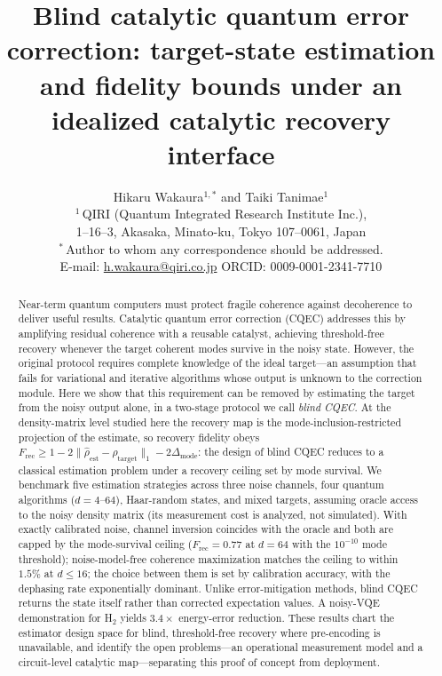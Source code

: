 \documentclass[12pt,a4paper]{article}
\newcommand{\Frec}{F_\mathrm{rec}}
\newcommand{\rhot}{\rho_\mathrm{target}}
\newcommand{\rhoe}{\hat{\rho}_\mathrm{est}}
\begin{document}
\title{Blind catalytic quantum error correction: target-state estimation and fidelity bounds under an idealized catalytic recovery interface}

\author{Hikaru Wakaura$^{1,*}$ and Taiki Tanimae$^{1}$\\[0.6em]
\small $^{1}$\,QIRI (Quantum Integrated Research Institute Inc.),\\
\small 1--16--3, Akasaka, Minato-ku, Tokyo 107--0061, Japan\\[0.3em]
\small $^{*}$\,Author to whom any correspondence should be addressed.\\
\small E-mail: \href{mailto:h.wakaura@qiri.co.jp}{h.wakaura@qiri.co.jp} \quad ORCID: 0009-0001-2341-7710}
\date{}
\maketitle

\begin{abstract}
Near-term quantum computers must protect fragile coherence against decoherence to deliver useful results.
Catalytic quantum error correction (CQEC) addresses this by amplifying residual coherence with a reusable catalyst, achieving threshold-free recovery whenever the target coherent modes survive in the noisy state.
However, the original protocol requires complete knowledge of the ideal target---an assumption that fails for variational and iterative algorithms whose output is unknown to the correction module.
Here we show that this requirement can be removed by estimating the target from the noisy output alone, in a two-stage protocol we call \emph{blind CQEC}.
At the density-matrix level studied here the recovery map is the mode-inclusion-restricted projection of the estimate, so recovery fidelity obeys $\Frec \geq 1 - 2\|\rhoe - \rhot\|_1 - 2\Delta_\mathrm{mode}$: the design of blind CQEC reduces to a classical estimation problem under a recovery ceiling set by mode survival.
We benchmark five estimation strategies across three noise channels, four quantum algorithms ($d = 4$--$64$), Haar-random states, and mixed targets, assuming oracle access to the noisy density matrix (its measurement cost is analyzed, not simulated).
With exactly calibrated noise, channel inversion coincides with the oracle and both are capped by the mode-survival ceiling ($\Frec = 0.77$ at $d = 64$ with the $10^{-10}$ mode threshold); noise-model-free coherence maximization matches the ceiling to within $1.5\%$ at $d \leq 16$; the choice between them is set by calibration accuracy, with the dephasing rate exponentially dominant.
Unlike error-mitigation methods, blind CQEC returns the state itself rather than corrected expectation values.
A noisy-VQE demonstration for H$_2$ yields $3.4\times$ energy-error reduction.
These results chart the estimator design space for blind, threshold-free recovery where pre-encoding is unavailable, and identify the open problems---an operational measurement model and a circuit-level catalytic map---separating this proof of concept from deployment.
\end{abstract}
\end{document}
